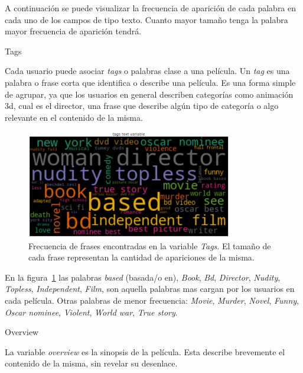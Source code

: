 \documentclass[11pt,a4paper,twoside]{thesis}
\begin{document}
A continuación se puede visualizar la frecuencia de aparición de cada palabra
en cada uno de los campos de tipo texto. Cuanto mayor tamaño tenga la palabra
mayor frecuencia de aparición tendrá.

\begin{description}
	\item[Tags]
\end{description}

Cada usuario puede asociar \textit{tags} o palabras clase a una película. Un
\textit{tag} es una palabra o frase corta que identifica o describe una
película. Es una forma simple de agrupar, ya que los usuarios en general
describen categorías como animación 3d, cual es el director, una frase que
describe algún tipo de categoría o algo relevante en el contenido de la misma.

\begin{figure}[h!]
	\centering
	\includegraphics[width=9cm]{./images/Cloud-tags.png}
	\caption{Frecuencia de frases encontradas en la variable \textit{Tags}. El tamaño de cada frase representan la cantidad de apariciones de la misma.}
	\label{fig:tagsCloud}
\end{figure}

En la figura~\ref{fig:tagsCloud} las palabras \textit{based} (basada/o en),
\textit{Book}, \textit{Bd}, \textit{Director}, \textit{Nudity},
\textit{Topless}, \textit{Independent}, \textit{Film}, son aquella palabras mas
cargan por los usuarios en cada película. Otras palabras de menor frecuencia:
\textit{Movie}, \textit{Murder}, \textit{Novel}, \textit{Funny}, \textit{Oscar
	nominee}, \textit{Violent}, \textit{World war}, \textit{True story}.

\clearpage

\begin{description}
	\item[Overview ]
\end{description}

La variable \textit{overview} es la sinopsis de la película. Esta describe
brevemente el contenido de la misma, sin revelar su desenlace.
\end{document}
